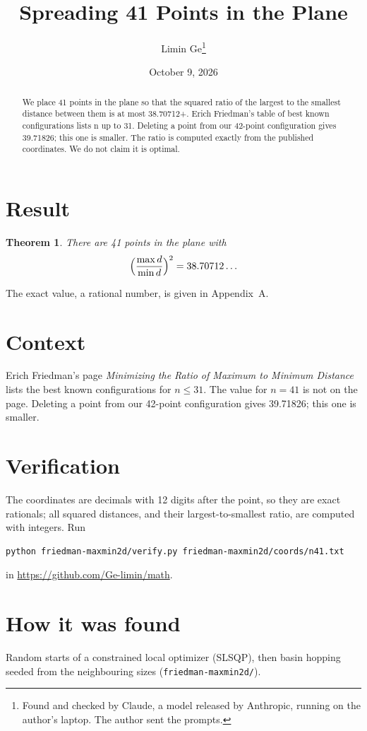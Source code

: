 \documentclass[11pt,a4paper]{article}
\title{Spreading 41 Points in the Plane}
\author{Limin Ge\thanks{Found and checked by Claude, a model released by Anthropic, running on the author's laptop. The author sent the prompts.}}
\date{October 9, 2026}
\newtheorem*{theorem}{Theorem}
\begin{document}
\maketitle
\begin{abstract}
We place 41 points in the plane so that the squared ratio of the largest to the smallest distance between them is at most 38.70712+. Erich Friedman's table of best known configurations lists n up to 31. Deleting a point from our 42-point configuration gives 39.71826; this one is smaller. The ratio is computed exactly from the published coordinates. We do not claim it is optimal.
\end{abstract}

\section{Result}
\begin{theorem}
There are 41 points in the plane with
\[ \Bigl(\frac{\max d}{\min d}\Bigr)^2 = 38.70712\ldots \]
\end{theorem}
The exact value, a rational number, is given in Appendix~A.


\section{Context}
Erich Friedman's page \emph{Minimizing the Ratio of Maximum to Minimum Distance} lists the best known configurations for $n\le 31$. The value for $n=41$ is not on the page. Deleting a point from our 42-point configuration gives 39.71826; this one is smaller.


\section{Verification}
The coordinates are decimals with 12 digits after the point, so they are exact rationals; all squared distances, and their largest-to-smallest ratio, are computed with integers. Run
\begin{verbatim}
python friedman-maxmin2d/verify.py friedman-maxmin2d/coords/n41.txt
\end{verbatim}
in \url{https://github.com/Ge-limin/math}.


\section{How it was found}
Random starts of a constrained local optimizer (SLSQP), then basin hopping seeded from the neighbouring sizes (\texttt{friedman-maxmin2d/}).
\end{document}
